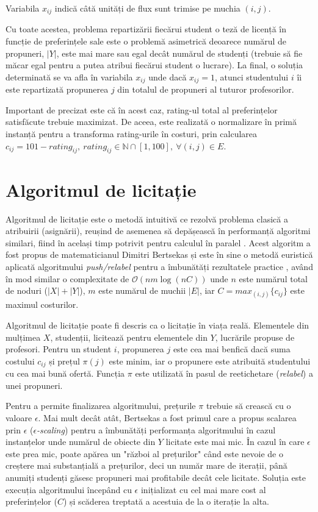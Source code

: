 Variabila $x_{ij}$ indică câtă unități de flux sunt trimise pe muchia $(i, j)$.

Cu toate acestea, problema repartizării fiecărui student o teză de licență în funcție de preferințele sale este o problemă asimetrică deoarece numărul de propuneri, $|Y|$, este mai mare sau egal decât numărul de studenți (trebuie să fie măcar egal pentru a putea atribui fiecărui student o lucrare). La final, o soluția determinată se va afla în variabila $x_{ij}$ unde dacă $x_{ij} = 1$, atunci studentului $i$ îi este repartizată propunerea $j$ din totalul de propuneri al tuturor profesorilor.

Important de precizat este că în acest caz, rating-ul total al preferințelor satisfăcute trebuie maximizat. De aceea, este realizată o normalizare în primă instanță pentru a transforma rating-urile în costuri, prin calcularea $c_{ij} = 101 - rating_{ij},\: rating_{ij} \in \mathbb{N} \cap [1, 100],\: \forall (i, j) \in E$.

\section{Algoritmul de licitație}

Algoritmul de licitație este o metodă intuitivă ce rezolvă problema clasică a atribuirii (asignării), reușind de asemenea să depășească în performanță algoritmi similari, fiind în același timp potrivit pentru calculul în paralel \cite[p.~1]{auction}. Acest algoritm a fost propus de matematicianul Dimitri Bertsekas și este în sine o metodă euristică aplicată algoritmului \textit{push/relabel} pentru a îmbunătăți rezultatele practice \cite[p.~24]{assignment}, având în mod similar o complexitate de $\mathcal{O}(n m \log(n C))$ unde $n$ este numărul total de noduri ($|X|+|Y|$), $m$ este numărul de muchii $|E|$, iar $C = max_{(i, j)}\{c_{ij}\}$ este maximul costurilor. 

Algoritmul de licitație poate fi descris ca o licitație în viața reală. Elementele din mulțimea $X$, studenții, licitează pentru elementele din $Y$, lucrările propuse de profesori. Pentru un student $i$, propunerea $j$ este cea mai benfică dacă suma costului $c_{ij}$ și prețul $\pi(j)$ este minim, iar o propunere este atribuită studentului cu cea mai bună ofertă\cite{assignment}. Funcția $\pi$ este utilizată în pasul de reetichetare (\textit{relabel}) a unei propuneri.

Pentru a permite finalizarea algoritmului, prețurile $\pi$ trebuie să crească cu o valoare $\epsilon$. Mai mult decât atât, Bertsekas a fost primul care a propus scalarea prin $\epsilon$ (\textit{$\epsilon$-scaling}) pentru a îmbunătăți performanța algoritmului în cazul instanțelor unde numărul de obiecte din $Y$ licitate este mai mic. În cazul în care $\epsilon$ este prea mic, poate apărea un "război al prețurilor" când este nevoie de o creștere mai substanțială a prețurilor, deci un număr mare de iterații, până anumiți studenți găsesc propuneri mai profitabile decât cele licitate. Soluția este execuția algoritmului începând cu $\epsilon$ inițializat cu cel mai mare cost al preferințelor ($C$) și scăderea treptată a acestuia de la o iterație la alta.

